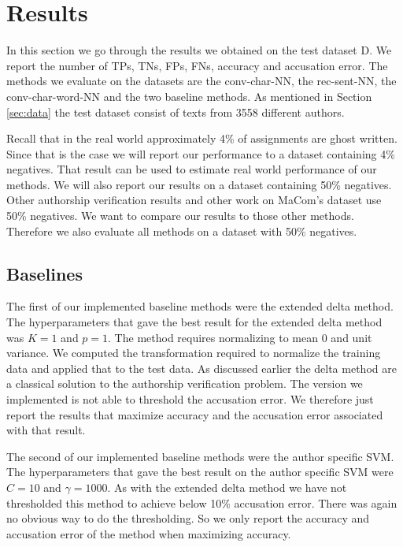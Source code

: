 \section{Results} \label{sec:results}

In this section we go through the results we obtained on the test dataset
\gls{D}. We report the number of \glspl{TP}, \glspl{TN}, \glspl{FP}, \glspl{FN},
accuracy and accusation error. The methods we evaluate on the datasets are the
\gls{conv-char-NN}, the \gls{rec-sent-NN}, the \gls{conv-char-word-NN} and the
two baseline methods. As mentioned in Section \ref{sec:data} the test dataset
consist of texts from 3558 different authors.

Recall that in the real world approximately 4\% of assignments are ghost
written. Since that is the case we will report our performance to a dataset
containing 4\% negatives. That result can be used to estimate real world
performance of our methods. We will also report our results on a dataset
containing 50\% negatives. Other authorship verification results and other work
on MaCom's dataset use 50\% negatives. We want to compare our results to those
other methods. Therefore we also evaluate all methods on a dataset with 50\%
negatives.


\subsection{Baselines}

The first of our implemented baseline methods were the extended delta method.
The hyperparameters that gave the best result for the extended delta method
was $K = 1$ and $p = 1$. The method requires normalizing to mean 0 and unit
variance. We computed the transformation required to normalize the training
data and applied that to the test data. As discussed earlier the delta method
are a classical solution to the authorship verification problem. The version we
implemented is not able to threshold the accusation error. We therefore just
report the results that maximize accuracy and the accusation error associated
with that result.

The second of our implemented baseline methods were the author specific
\gls{SVM}. The hyperparameters that gave the best result on the author specific
\gls{SVM} were $C = 10$ and $\gamma = 1000$. As with the extended delta method
we have not thresholded this method to achieve below 10\% accusation error.
There was again no obvious way to do the thresholding. So we only report the
accuracy and accusation error of the method when maximizing accuracy.


